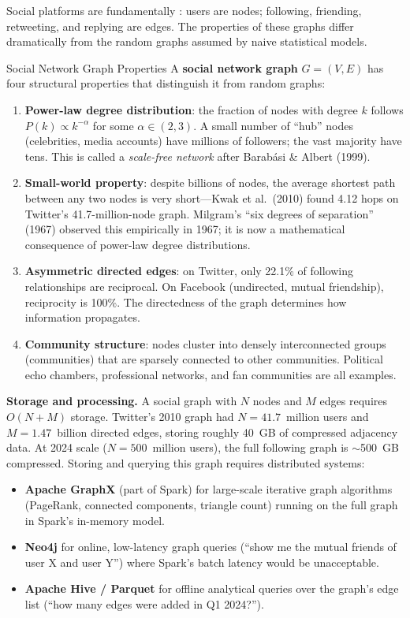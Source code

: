 Social platforms are fundamentally : users are
nodes; following, friending, retweeting, and replying are edges. The
properties of these graphs differ dramatically from the random graphs
assumed by naive statistical models.

\begin{defbox}{Social Network Graph Properties}
A \textbf{social network graph} $G = (V, E)$ has four structural
properties that distinguish it from random graphs:
\begin{enumerate}
  \item \textbf{Power-law degree distribution}: the fraction of nodes
        with degree $k$ follows $P(k) \propto k^{-\alpha}$ for some
        $\alpha \in (2, 3)$. A small number of ``hub'' nodes (celebrities,
        media accounts) have millions of followers; the vast majority
        have tens. This is called a \emph{scale-free network} after
        Barabási \& Albert (1999).
  \item \textbf{Small-world property}: despite billions of nodes, the
        average shortest path between any two nodes is very short---Kwak
        et al.\ (2010) found 4.12 hops on Twitter's 41.7-million-node
        graph. Milgram's ``six degrees of separation'' (1967) observed
        this empirically in 1967; it is now a mathematical consequence
        of power-law degree distributions.
  \item \textbf{Asymmetric directed edges}: on Twitter, only 22.1\%
        of following relationships are reciprocal. On Facebook (undirected,
        mutual friendship), reciprocity is 100\%. The directedness of the
        graph determines how information propagates.
  \item \textbf{Community structure}: nodes cluster into densely
        interconnected groups (communities) that are sparsely connected
        to other communities. Political echo chambers, professional
        networks, and fan communities are all examples.
\end{enumerate}
\end{defbox}

\textbf{Storage and processing.} A social graph with $N$ nodes and $M$
edges requires $O(N + M)$ storage. Twitter's 2010 graph had
$N = 41.7$~million users and $M = 1.47$~billion directed edges,
storing roughly 40~GB of compressed adjacency data. At 2024 scale
($N = 500$~million users), the full following graph is $\sim$500~GB
compressed. Storing and querying this graph requires distributed systems:
\begin{itemize}
  \item \textbf{Apache GraphX} (part of Spark) for large-scale iterative
        graph algorithms (PageRank, connected components, triangle count)
        running on the full graph in Spark's in-memory model.
  \item \textbf{Neo4j} for online, low-latency graph queries
        (``show me the mutual friends of user X and user Y'')
        where Spark's batch latency would be unacceptable.
  \item \textbf{Apache Hive / Parquet} for offline analytical queries
        over the graph's edge list (``how many edges were added in Q1 2024?'').
\end{itemize}

